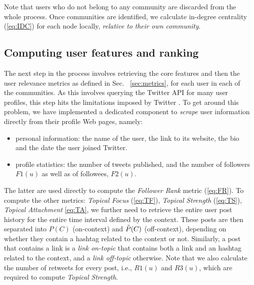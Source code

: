 \documentclass[runningheads]{llncs}
\begin{document}
Note that users who do not belong to any community are discarded from the whole process.
Once communities are identified, we calculate  in-degree centrality (\ref{eq:IDC}) for each node locally, \textit{relative to their own community}.



\subsection{Computing user features and ranking  }  \label{sec:features}

The next step in the process involves retrieving the core features and then the user relevance metrics as defined in Sec. ~\ref{sec:metrics}, for each user in each of the communities.
%
As this involves querying the Twitter API for many user profiles, this step hits the limitations imposed by Twitter .
To get around this problem, we have implemented a dedicated component to \textit{scrape} user information directly from their profile Web pages, namely:
\begin{itemize}
	\item personal information: the name of the user, the link to its website, the bio and the date the user joined Twitter.
	\item profile statistics: the number of tweets published, and the number of followers $F1(u)$ as well as of followees, $F2(u)$.
\end{itemize}
The latter are used directly to compute  the \textit{Follower Rank} metric (\ref{eq:FR}).
To compute the other metrics: \textit{Topical Focus} (\ref{eq:TF}), \textit{Topical Strength} (\ref{eq:TS}), \textit{Topical Attachment} \ref{eq:TA}, we further need to retrieve the entire user post history for the entire time interval defined by the context.
These posts are then separated into $P(C)$ (on-context) and $\Tilde{P}(C)$ (off-context), depending on whether they contain a hashtag related to the context or not.
Similarly, a post that contains a link is a \textit{link on-topic} that contains both a link and an hashtag related to the context, and a \textit{link off-topic} otherwise.
Note that we also calculate the number of retweets for every post, i.e., $\mathit{R1}(u)$ and $\mathit{R3}(u)$, which are required to compute \textit{Topical Strength}.
\end{document}
